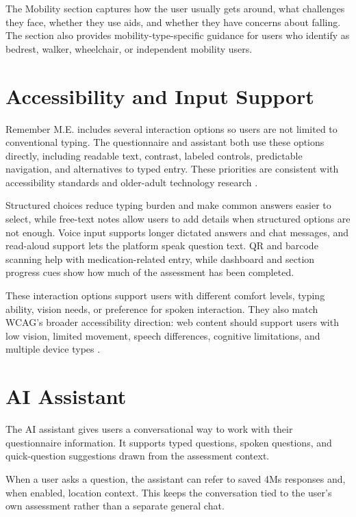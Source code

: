 \documentclass[11pt]{article}
\begin{document}
The Mobility section captures how the user usually gets around, what challenges they face, whether they use aids, and whether they have concerns about falling. The section also provides mobility-type-specific guidance for users who identify as bedrest, walker, wheelchair, or independent mobility users.

\section{Accessibility and Input Support}

Remember M.E. includes several interaction options so users are not limited to conventional typing. The questionnaire and assistant both use these options directly, including readable text, contrast, labeled controls, predictable navigation, and alternatives to typed entry. These priorities are consistent with accessibility standards and older-adult technology research \cite{wcag22,gomez-hernandez-older-adult-guidelines,vaportzis-tablet-barriers}.

Structured choices reduce typing burden and make common answers easier to select, while free-text notes allow users to add details when structured options are not enough. Voice input supports longer dictated answers and chat messages, and read-aloud support lets the platform speak question text. QR and barcode scanning help with medication-related entry, while dashboard and section progress cues show how much of the assessment has been completed.

These interaction options support users with different comfort levels, typing ability, vision needs, or preference for spoken interaction. They also match WCAG's broader accessibility direction: web content should support users with low vision, limited movement, speech differences, cognitive limitations, and multiple device types \cite{wcag22}.

\section{AI Assistant}

The AI assistant gives users a conversational way to work with their questionnaire information. It supports typed questions, spoken questions, and quick-question suggestions drawn from the assessment context.

When a user asks a question, the assistant can refer to saved 4Ms responses and, when enabled, location context. This keeps the conversation tied to the user's own assessment rather than a separate general chat.
\end{document}
